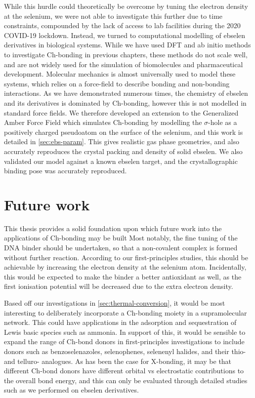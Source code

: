 \begin{refsection}
While this hurdle could theoretically be overcome by tuning the electron density at the selenium, we were not able to investigate this further due to time constraints, compounded by the lack of access to lab facilities during the 2020 COVID-19 lockdown.
Instead, we turned to computational modelling of ebselen derivatives in biological systems.
While we have used DFT and ab initio methods to investigate Ch-bonding in previous chapters, these methods do not scale well, and are not widely used for the simulation of biomolecules and pharmaceutical development.
Molecular mechanics is almost universally used to model these systems, which relies on a force-field to describe bonding and non-bonding interactions.
As we have demonstrated numerous times, the chemistry of ebselen and its derivatives is dominated by Ch-bonding, however this is not modelled in standard force fields.
We therefore developed an extension to the Generalized Amber Force Field which simulates Ch-bonding by modelling the $\sigma$-hole as a positively charged pseudoatom on the surface of the selenium, and this work is detailed in \cref{sec:ebs-param}.
This gives realistic gas phase geometries, and also accurately reproduces the crystal packing and density of solid ebselen.
We also validated our model against a known ebselen target, and the crystallographic binding pose was accurately reproduced.

\section{Future work}
This thesis provides a solid foundation upon which future work into the applications of Ch-bonding may be built
Most notably, the fine tuning of the DNA binder should be undertaken, so that a non-covalent complex is formed without further reaction.
According to our first-principles studies, this should be achievable by increasing the electron density at the selenium atom.
Incidentally, this would be expected to make the binder a better antioxidant as well, as the first ionisation potential will be decreased due to the extra electron density.

Based off our investigations in \cref{sec:thermal-conversion}, it would be most interesting to deliberately incorporate a Ch-bonding moiety in a supramolecular network.
This could have applications in the adsorption and sequestration of Lewis basic species such as ammonia.
In support of this, it would be sensible to expand the range of Ch-bond donors in first-principles investigations to include donors such as benzoselenazoles, selenophenes, selenenyl halides, and their thio- and telluro- analogues. 
As has been the case for X-bonding, it may be that different Ch-bond donors have different orbital vs electrostatic contributions to the overall bond energy, and this can only be evaluated through detailed studies such as we performed on ebselen derivatives.


\end{refsection}
